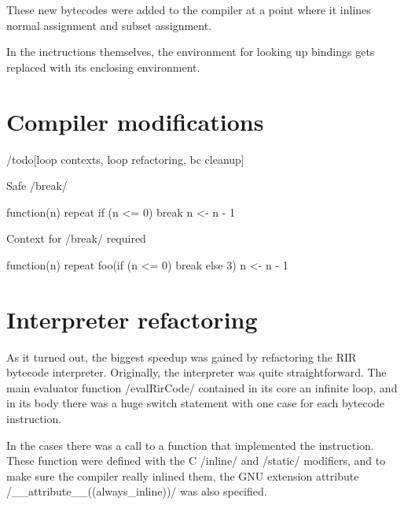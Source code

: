 These new bytecodes were added to the compiler at a point where it inlines normal assignment and subset assignment.

In the inctructions themselves, the environment for looking up bindings gets replaced with its enclosing environment.


\section{Compiler modifications}

/todo[loop contexts, loop refactoring, bc cleanup]

\begin{listing}[htbp]
  \caption{\label{lst:local-break}Safe \rinline/break/}
  \begin{rcode}
function(n) {
    repeat {
        if (n <= 0) break
        n <- n - 1
    }
}
  \end{rcode}
\end{listing}

\begin{listing}[htbp]
  \caption{\label{lst:non-local-break}Context for \rinline/break/ required}
  \begin{rcode}
function(n) {
    repeat {
        foo(if (n <= 0) break else 3)
        n <- n - 1
    }
}
  \end{rcode}
\end{listing}


\section{Interpreter refactoring}

As it turned out, the biggest speedup was gained by refactoring the RIR bytecode interpreter. Originally, the interpreter was quite straightforward. The main evaluator function \cinline/evalRirCode/ contained in its core an infinite loop, and in its body there was a huge switch statement with one case for each bytecode instruction.

In the cases there was a call to a function that implemented the instruction. These function were defined with the C \cinline/inline/ and \cinline/static/ modifiers, and to make sure the compiler really inlined them, the GNU extension attribute \cinline/__attribute__((always_inline))/ was also specified.

